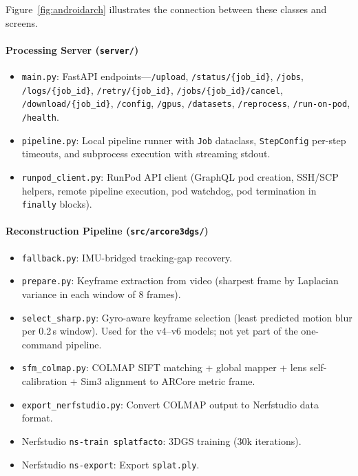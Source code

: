Figure~\ref{fig:androidarch} illustrates the connection between these classes and screens.

\paragraph{Processing Server (\texttt{server/})}
\begin{itemize}
    \item \texttt{main.py}: FastAPI endpoints---\texttt{/upload}, \texttt{/status/\{job\_id\}}, \texttt{/jobs}, \texttt{/logs/\{job\_id\}}, \texttt{/retry/\{job\_id\}}, \texttt{/jobs/\{job\_id\}/cancel}, \texttt{/download/\{job\_id\}}, \texttt{/config}, \texttt{/gpus}, \texttt{/datasets}, \texttt{/reprocess}, \texttt{/run-on-pod}, \texttt{/health}.
    \item \texttt{pipeline.py}: Local pipeline runner with \texttt{Job} dataclass, \texttt{StepConfig} per-step timeouts, and subprocess execution with streaming stdout.
    \item \texttt{runpod\_client.py}: RunPod API client (GraphQL pod creation, SSH/SCP helpers, remote pipeline execution, pod watchdog, pod termination in \texttt{finally} blocks).
\end{itemize}

\paragraph{Reconstruction Pipeline (\texttt{src/arcore3dgs/})}
\begin{itemize}
    \item \texttt{fallback.py}: IMU-bridged tracking-gap recovery.
    \item \texttt{prepare.py}: Keyframe extraction from video (sharpest frame by Laplacian variance in each window of 8 frames).
    \item \texttt{select\_sharp.py}: Gyro-aware keyframe selection (least predicted motion blur per 0.2\,s window). Used for the v4--v6 models; not yet part of the one-command pipeline.
    \item \texttt{sfm\_colmap.py}: COLMAP SIFT matching + global mapper + lens self-calibration + Sim3 alignment to ARCore metric frame.
    \item \texttt{export\_nerfstudio.py}: Convert COLMAP output to Nerfstudio data format.
    \item Nerfstudio \texttt{ns-train splatfacto}: 3DGS training (30k iterations).
    \item Nerfstudio \texttt{ns-export}: Export \texttt{splat.ply}.
\end{itemize}

